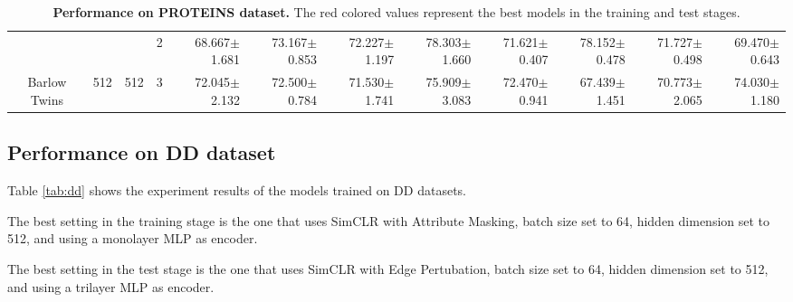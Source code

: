 \begin{table}[htpb]
{\begin{tabular}{c|c|c|c|rr|rr|rr|rr}
                                 &                                                                                 &                                                                                        & 2                                                                                         & 68.667$\pm$1.681                        & 73.167$\pm$0.853                        & 72.227$\pm$1.197                        & 78.303$\pm$1.660                        & 71.621$\pm$0.407                        & 78.152$\pm$0.478                        & 71.727$\pm$0.498                        & 69.470$\pm$0.643                       \\
\multirow{-12}{*}{Barlow Twins}  & \multirow{-6}{*}{512}                                                           & \multirow{-3}{*}{512}                                                                  & 3                                                                                         & 72.045$\pm$2.132                        & 72.500$\pm$0.784                        & 71.530$\pm$1.741                        & 75.909$\pm$3.083                        & 72.470$\pm$0.941                        & 67.439$\pm$1.451                        & 70.773$\pm$2.065                        & 74.030$\pm$1.180                       \\ \hline
\end{tabular}
}
    \caption[Performance on PROTEINS dataset]{\textbf{Performance on PROTEINS dataset.} The red colored values represent the best models in the training and test stages.}
    \label{tab:protein}
\end{table}

\subsection{Performance on DD dataset}


Table \ref{tab:dd} shows the experiment results of the models trained on DD datasets. 

The best setting in the training stage is the one that uses SimCLR with Attribute Masking, batch size set to 64, hidden dimension set to 512, and using a monolayer MLP as encoder.

The best setting in the test stage is the one that uses SimCLR with Edge Pertubation, batch size set to 64, hidden dimension set to 512, and using a trilayer MLP as encoder.

